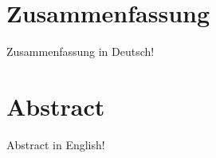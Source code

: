 
\section*{Zusammenfassung}
Zusammenfassung in Deutsch!

\pagebreak

\section*{Abstract}
Abstract in English!
